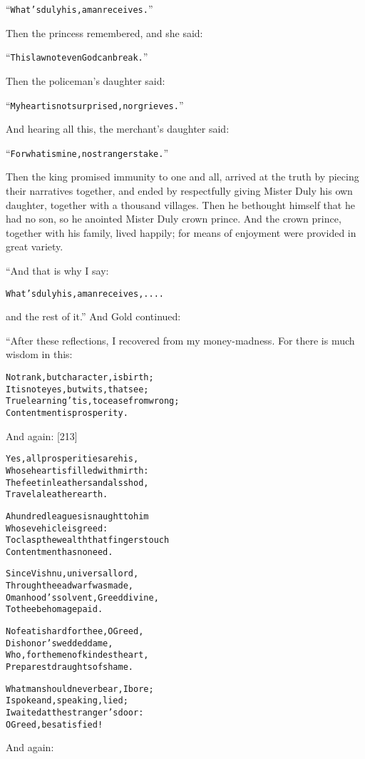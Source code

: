 \documentclass{article}
\renewenvironment{verbatim}{\begin{alltt}\normalfont\begin{centering}}{\end{centering}\end{alltt}}
\begin{document}
\begin{verbatim}
“What's duly his, a man receives.”
\end{verbatim}
Then the princess remembered, and she said:

\begin{verbatim}
“This law not even God can break.”
\end{verbatim}
Then the policeman's daughter said:

\begin{verbatim}
“My heart is not surprised, nor grieves.”
\end{verbatim}
And hearing all this, the merchant's daughter said:

\begin{verbatim}
“For what is mine, no strangers take.”
\end{verbatim}
Then the king promised immunity to one and all, arrived at the
truth by piecing their narratives together, and ended by
respectfully giving Mister Duly his own daughter, together with a
thousand villages. Then he bethought himself that he had no son, so
he anointed Mister Duly crown prince. And the crown prince,
together with his family, lived happily; for means of enjoyment
were provided in great variety.

“And that is why I say:

\begin{verbatim}
What's duly his, a man receives, ....
\end{verbatim}
and the rest of it.” And Gold continued:

“After these reflections, I recovered from my money-madness. For
there is much wisdom in this:

\begin{verbatim}
Not rank, but character, is birth;
    It is not eyes, but wits, that see;
True learning 'tis, to cease from wrong;
    Contentment is prosperity.
\end{verbatim}
And again: [213]

\begin{verbatim}
Yes, all prosperities are his,
    Whose heart is filled with mirth:
The feet in leather sandals shod,
    Travel a leather earth.

A hundred leagues is naught to him
    Whose vehicle is greed:
To clasp the wealth that fingers touch
    Contentment has no need.

Since Vishnu, universal lord,
    Through thee a dwarf was made,
O manhood's solvent, Greed divine,
    To thee be homage paid.

No feat is hard for thee, O Greed,
    Dishonor's wedded dame,
Who, for the men of kindest heart,
    Preparest draughts of shame.

What man should never bear, I bore;
    I spoke and, speaking, lied;
I waited at the stranger's door:
    O Greed, be satisfied!
\end{verbatim}
And again:
\end{document}
